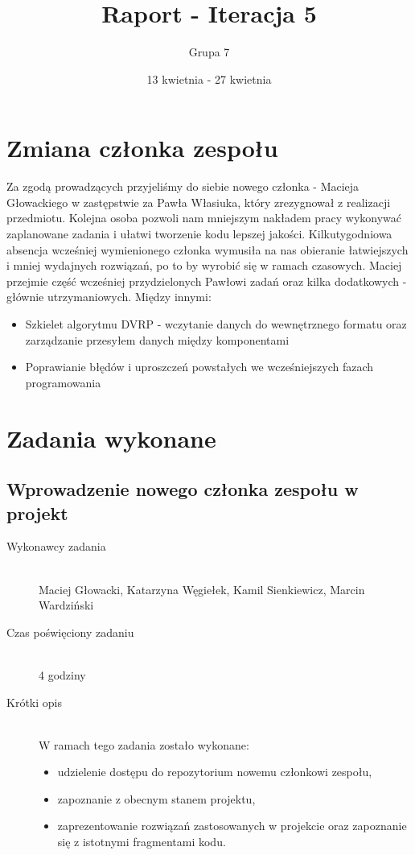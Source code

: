 \documentclass[a4paper]{article}
\title{Raport - Iteracja 5}
\date{13 kwietnia - 27 kwietnia}
\author{Grupa 7}
\begin{document}
\maketitle

\section{Zmiana członka zespołu}
Za zgodą prowadzących przyjeliśmy do siebie nowego członka - Macieja Głowackiego w zastępstwie za Pawła Własiuka, który zrezygnował z realizacji przedmiotu. Kolejna osoba pozwoli nam mniejszym nakładem pracy wykonywać zaplanowane zadania i ułatwi tworzenie kodu lepszej jakości. Kilkutygodniowa absencja wcześniej wymienionego członka wymusiła na nas obieranie łatwiejszych i mniej wydajnych rozwiązań, po to by wyrobić się w ramach czasowych. Maciej przejmie część wcześniej przydzielonych Pawłowi zadań oraz kilka dodatkowych - głównie utrzymaniowych. Między innymi:
\begin{itemize}
\item Szkielet algorytmu DVRP - wczytanie danych do wewnętrznego formatu oraz zarządzanie przesyłem danych między komponentami
\item Poprawianie błędów i uproszczeń powstałych we wcześniejszych fazach programowania
\end{itemize}

\section{Zadania wykonane}
\subsection{Wprowadzenie nowego członka zespołu w projekt}
\begin{description}
    \item[Wykonawcy zadania] \hfill \\ Maciej Głowacki, Katarzyna Węgiełek, Kamil Sienkiewicz, Marcin Wardziński
    \item[Czas poświęciony zadaniu] \hfill \\ 4 godziny
    \item[Krótki opis] \hfill \\ W ramach tego zadania zostało wykonane:
    \begin{itemize}
    	\item udzielenie dostępu do repozytorium nowemu członkowi zespołu,
    	\item zapoznanie z obecnym stanem projektu,
    	\item zaprezentowanie rozwiązań zastosowanych w projekcie oraz zapoznanie się z istotnymi fragmentami kodu. 
    \end{itemize}
\end{description}
\end{document}
